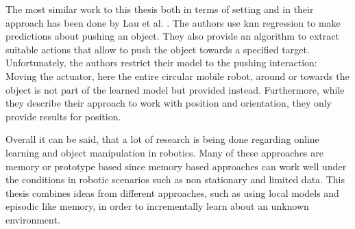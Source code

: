 The most similar work to this thesis both in terms of setting and in their approach has been done by 
Lau et al. \cite{pushing}. The authors use \gls{knn} regression to make predictions about pushing an object. They also provide an algorithm to extract suitable actions that allow to push the object towards a specified target. Unfortunately, the authors restrict their model to the pushing interaction: Moving the actuator, here the entire circular mobile robot, around or towards the object is not part of the learned model but provided instead. Furthermore, while they describe their approach to work with position and orientation, they only provide results for position. 

Overall it can be said, that a lot of research is being done regarding online learning and object manipulation in robotics. Many of these approaches are memory or prototype based since memory based approaches can work well under the conditions in robotic scenarios such as non stationary and limited data. 
This thesis combines ideas from different approaches, such as using local models and episodic like memory, in order to incrementally learn about an unknown environment.


